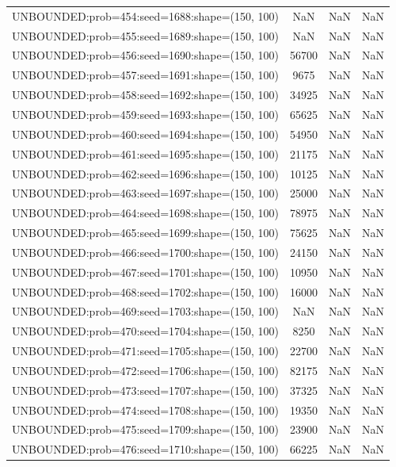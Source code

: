 \begin{longtable}{lccc}
UNBOUNDED:prob=454:seed=1688:shape=(150, 100) &   NaN &   NaN &    NaN \\
UNBOUNDED:prob=455:seed=1689:shape=(150, 100) &   NaN &   NaN &    NaN \\
UNBOUNDED:prob=456:seed=1690:shape=(150, 100) & 56700 &   NaN &    NaN \\
UNBOUNDED:prob=457:seed=1691:shape=(150, 100) &  9675 &   NaN &    NaN \\
UNBOUNDED:prob=458:seed=1692:shape=(150, 100) & 34925 &   NaN &    NaN \\
UNBOUNDED:prob=459:seed=1693:shape=(150, 100) & 65625 &   NaN &    NaN \\
UNBOUNDED:prob=460:seed=1694:shape=(150, 100) & 54950 &   NaN &    NaN \\
UNBOUNDED:prob=461:seed=1695:shape=(150, 100) & 21175 &   NaN &    NaN \\
UNBOUNDED:prob=462:seed=1696:shape=(150, 100) & 10125 &   NaN &    NaN \\
UNBOUNDED:prob=463:seed=1697:shape=(150, 100) & 25000 &   NaN &    NaN \\
UNBOUNDED:prob=464:seed=1698:shape=(150, 100) & 78975 &   NaN &    NaN \\
UNBOUNDED:prob=465:seed=1699:shape=(150, 100) & 75625 &   NaN &    NaN \\
UNBOUNDED:prob=466:seed=1700:shape=(150, 100) & 24150 &   NaN &    NaN \\
UNBOUNDED:prob=467:seed=1701:shape=(150, 100) & 10950 &   NaN &    NaN \\
UNBOUNDED:prob=468:seed=1702:shape=(150, 100) & 16000 &   NaN &    NaN \\
UNBOUNDED:prob=469:seed=1703:shape=(150, 100) &   NaN &   NaN &    NaN \\
UNBOUNDED:prob=470:seed=1704:shape=(150, 100) &  8250 &   NaN &    NaN \\
UNBOUNDED:prob=471:seed=1705:shape=(150, 100) & 22700 &   NaN &    NaN \\
UNBOUNDED:prob=472:seed=1706:shape=(150, 100) & 82175 &   NaN &    NaN \\
UNBOUNDED:prob=473:seed=1707:shape=(150, 100) & 37325 &   NaN &    NaN \\
UNBOUNDED:prob=474:seed=1708:shape=(150, 100) & 19350 &   NaN &    NaN \\
UNBOUNDED:prob=475:seed=1709:shape=(150, 100) & 23900 &   NaN &    NaN \\
UNBOUNDED:prob=476:seed=1710:shape=(150, 100) & 66225 &   NaN &    NaN \\

\end{longtable}
